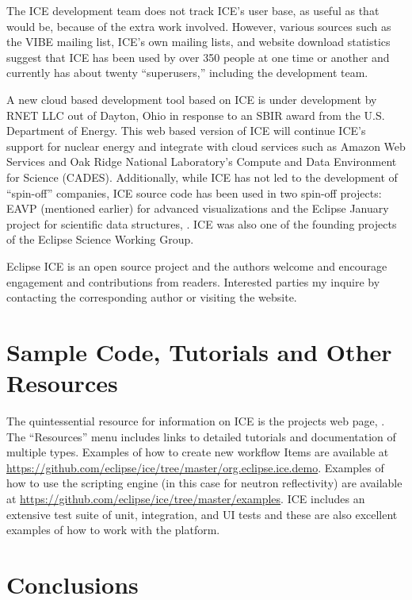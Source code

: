 The ICE development team does not track ICE's user base, as useful as
that would be, because of the extra work involved. However, various
sources such as the VIBE mailing list, ICE's own mailing lists, and
website download statistics suggest that ICE has been used by over 350
people at one time or another and currently has about twenty
``superusers,'' including the development team.

A new cloud based development tool based on ICE is under development by
RNET LLC out of Dayton, Ohio in response to an SBIR award from the U.S.
Department of Energy. This web based version of ICE will continue ICE's
support for nuclear energy and integrate with cloud services such as
Amazon Web Services and Oak Ridge National Laboratory's Compute and Data
Environment for Science (CADES). Additionally, while ICE has not led to
the development of ``spin-off'' companies, ICE source code has been used
in two spin-off projects: EAVP (mentioned earlier) for advanced
visualizations and the Eclipse January project for scientific data
structures, \cite{graham_eclipse_2016}. ICE was also one of the founding
projects of the Eclipse Science Working Group.

Eclipse ICE is an open source project and the authors welcome and encourage
engagement and contributions from readers. Interested parties my inquire by
contacting the corresponding author or visiting the website.

\section{Sample Code, Tutorials and Other
Resources}\label{sample-code-tutorials-and-other-resources}

The quintessential resource for information on ICE is the projects web
page, \cite{billings_eclipse_2016}. The ``Resources'' menu includes links to
detailed tutorials and documentation of multiple types. Examples of how to create
new workflow Items are available at
\url{https://github.com/eclipse/ice/tree/master/org.eclipse.ice.demo}.
Examples of how to use the scripting engine (in this case for neutron
reflectivity) are available at
\url{https://github.com/eclipse/ice/tree/master/examples}. ICE includes an
extensive test suite of unit, integration, and UI tests and these are
also excellent examples of how to work with the platform.

\section{Conclusions}\label{conclusions}

